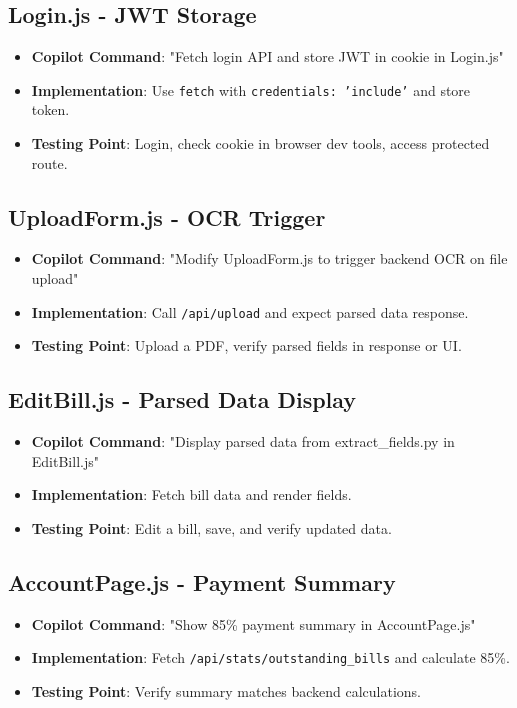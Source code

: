 \documentclass[a4paper,12pt]{article}
\begin{document}
\subsection{Login.js - JWT Storage}
\begin{itemize}
    \item \textbf{Copilot Command}: "Fetch login API and store JWT in cookie in Login.js"
    \item \textbf{Implementation}: Use \texttt{fetch} with \texttt{credentials: 'include'} and store token.
    \item \textbf{Testing Point}: Login, check cookie in browser dev tools, access protected route.
\end{itemize}

\subsection{UploadForm.js - OCR Trigger}
\begin{itemize}
    \item \textbf{Copilot Command}: "Modify UploadForm.js to trigger backend OCR on file upload"
    \item \textbf{Implementation}: Call \texttt{/api/upload} and expect parsed data response.
    \item \textbf{Testing Point}: Upload a PDF, verify parsed fields in response or UI.
\end{itemize}

\subsection{EditBill.js - Parsed Data Display}
\begin{itemize}
    \item \textbf{Copilot Command}: "Display parsed data from extract_fields.py in EditBill.js"
    \item \textbf{Implementation}: Fetch bill data and render fields.
    \item \textbf{Testing Point}: Edit a bill, save, and verify updated data.
\end{itemize}

\subsection{AccountPage.js - Payment Summary}
\begin{itemize}
    \item \textbf{Copilot Command}: "Show 85\% payment summary in AccountPage.js"
    \item \textbf{Implementation}: Fetch \texttt{/api/stats/outstanding_bills} and calculate 85\%.
    \item \textbf{Testing Point}: Verify summary matches backend calculations.
\end{itemize}
\end{document}
